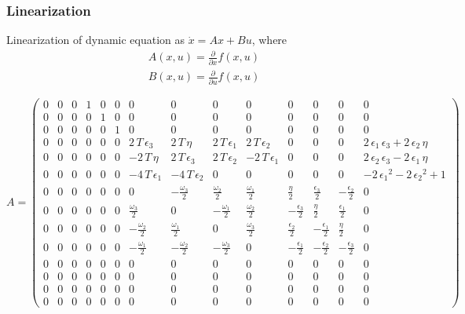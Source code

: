\documentclass{beamer}
\begin{document}
\begin{frame}
    \frametitle{Linearization}
    Linearization of dynamic equation as $\dot{x}=A x+B u$, where
    \begin{equation}
        \begin{array}{l}
            A(x, u)=\frac{\partial}{\partial x} f(x, u) \\
            B(x, u)=\frac{\partial}{\partial u} f(x, u)
        \end{array}
    \end{equation}

    \begin{equation*}
        A = \left(\begin{array}{cccccccccccccc} 0 & 0 & 0 & 1 & 0 & 0 & 0 & 0 & 0 & 0 & 0 & 0 & 0 & 0\\ 0 & 0 & 0 & 0 & 1 & 0 & 0 & 0 & 0 & 0 & 0 & 0 & 0 & 0\\ 0 & 0 & 0 & 0 & 0 & 1 & 0 & 0 & 0 & 0 & 0 & 0 & 0 & 0\\ 0 & 0 & 0 & 0 & 0 & 0 & 2\,T\,\epsilon _{3} & 2\,T\,\eta  & 2\,T\,\epsilon _{1} & 2\,T\,\epsilon _{2} & 0 & 0 & 0 & 2\,\epsilon _{1}\,\epsilon _{3}+2\,\epsilon _{2}\,\eta \\ 0 & 0 & 0 & 0 & 0 & 0 & -2\,T\,\eta  & 2\,T\,\epsilon _{3} & 2\,T\,\epsilon _{2} & -2\,T\,\epsilon _{1} & 0 & 0 & 0 & 2\,\epsilon _{2}\,\epsilon _{3}-2\,\epsilon _{1}\,\eta \\ 0 & 0 & 0 & 0 & 0 & 0 & -4\,T\,\epsilon _{1} & -4\,T\,\epsilon _{2} & 0 & 0 & 0 & 0 & 0 & -2\,{\epsilon _{1}}^2-2\,{\epsilon _{2}}^2+1\\ 0 & 0 & 0 & 0 & 0 & 0 & 0 & -\frac{\omega _{3}}{2} & \frac{\omega _{2}}{2} & \frac{\omega _{1}}{2} & \frac{\eta }{2} & \frac{\epsilon _{3}}{2} & -\frac{\epsilon _{2}}{2} & 0\\ 0 & 0 & 0 & 0 & 0 & 0 & \frac{\omega _{3}}{2} & 0 & -\frac{\omega _{1}}{2} & \frac{\omega _{2}}{2} & -\frac{\epsilon _{3}}{2} & \frac{\eta }{2} & \frac{\epsilon _{1}}{2} & 0\\ 0 & 0 & 0 & 0 & 0 & 0 & -\frac{\omega _{2}}{2} & \frac{\omega _{1}}{2} & 0 & \frac{\omega _{3}}{2} & \frac{\epsilon _{2}}{2} & -\frac{\epsilon _{1}}{2} & \frac{\eta }{2} & 0\\ 0 & 0 & 0 & 0 & 0 & 0 & -\frac{\omega _{1}}{2} & -\frac{\omega _{2}}{2} & -\frac{\omega _{3}}{2} & 0 & -\frac{\epsilon _{1}}{2} & -\frac{\epsilon _{2}}{2} & -\frac{\epsilon _{3}}{2} & 0\\ 0 & 0 & 0 & 0 & 0 & 0 & 0 & 0 & 0 & 0 & 0 & 0 & 0 & 0\\ 0 & 0 & 0 & 0 & 0 & 0 & 0 & 0 & 0 & 0 & 0 & 0 & 0 & 0\\ 0 & 0 & 0 & 0 & 0 & 0 & 0 & 0 & 0 & 0 & 0 & 0 & 0 & 0\\ 0 & 0 & 0 & 0 & 0 & 0 & 0 & 0 & 0 & 0 & 0 & 0 & 0 & 0 \end{array}\right)
    \end{equation*}

\end{frame}
\end{document}
